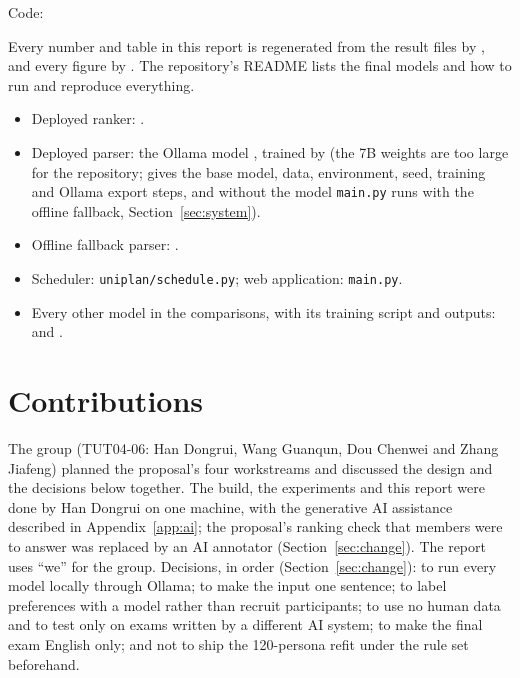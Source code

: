 Code: \repo

Every number and table in this report is regenerated from the result files by , and every figure by . The repository's README lists the final models and how to run and reproduce everything.
\begin{itemize}[leftmargin=*]
	\item Deployed ranker: .
	\item Deployed parser: the Ollama model , trained by  (the 7B weights are too large for the repository;  gives the base model, data, environment, seed, training and Ollama export steps, and without the model \texttt{main.py} runs with the offline fallback, Section~\ref{sec:system}).
	\item Offline fallback parser: .
	\item Scheduler: \texttt{uniplan/schedule.py}; web application: \texttt{main.py}.
	\item Every other model in the comparisons, with its training script and outputs:  and .
\end{itemize}

\section{Contributions}\label{app:contrib}

The group (TUT04-06: Han Dongrui, Wang Guanqun, Dou Chenwei and Zhang Jiafeng) planned the proposal's four workstreams and discussed the design and the decisions below together. The build, the experiments and this report were done by Han Dongrui on one machine, with the generative AI assistance described in Appendix~\ref{app:ai}; the proposal's ranking check that members were to answer was replaced by an AI annotator (Section~\ref{sec:change}). The report uses ``we'' for the group. Decisions, in order (Section~\ref{sec:change}): to run every model locally through Ollama; to make the input one sentence; to label preferences with a model rather than recruit participants; to use no human data and to test only on exams written by a different AI system; to make the final exam English only; and not to ship the 120-persona refit under the rule set beforehand.
